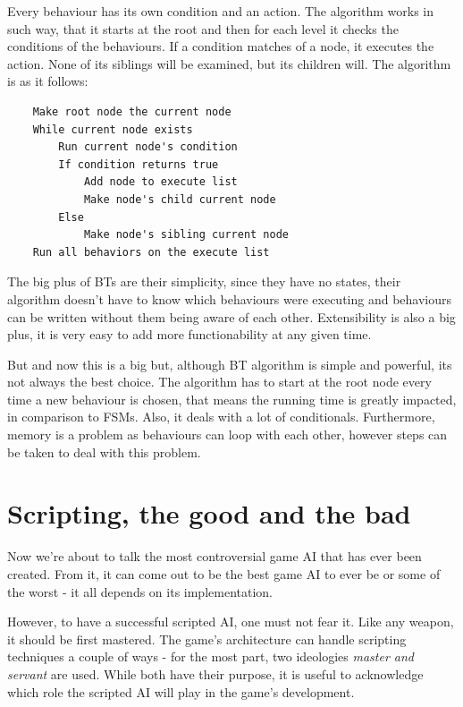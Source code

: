 \documentclass[a4paper, 12pt]{book}
\begin{document}
Every behaviour has its own condition and an action. The algorithm works in such way, that it starts at the root and then for each level it checks the conditions of the behaviours. If a condition matches of a node, it executes the action. None of its siblings will be examined, but its children will. The algorithm \cite{BehaviourSelectionAlgorithms} is as it follows:
\begin{verbatim}
    Make root node the current node
    While current node exists
        Run current node's condition
        If condition returns true
            Add node to execute list
            Make node's child current node
        Else
            Make node's sibling current node
    Run all behaviors on the execute list
\end{verbatim}

The big plus of BTs \cite{BehaviourSelectionAlgorithms} are their simplicity, since they have no states, their algorithm doesn't have to know which behaviours were executing and behaviours can be written without them being aware of each other. Extensibility is also a big plus, it is very easy to add more functionability at any given time.

But and now this is a big but, although BT algorithm is simple and powerful, its not always the best choice. The algorithm has to start at the root node every time a new behaviour is chosen, that means the running time is greatly impacted, in comparison to FSMs. Also, it deals with a lot of conditionals. Furthermore, memory is a problem as behaviours can loop with each other, however steps can be taken to deal with this problem.

\section{Scripting, the good and the bad}

Now we're about to talk the most controversial game AI that has ever been created. From it, it can come out to be the best game AI to ever be or some of the worst - it all depends on its implementation.

However, to have a successful scripted AI, one must not fear it. Like any weapon, it should be first mastered. 
The game's architecture can handle scripting techniques a couple of ways - for the most part, two ideologies \emph{master and servant} \cite{ForbiddenScripting} are used. While both have their purpose, it is useful to acknowledge which role the scripted AI will play in the game's development.
\end{document}
